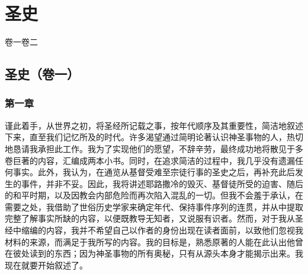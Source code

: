 
\chapter{圣史}


卷一\newline{}卷二\par



\section{圣史（卷一）}


\subsection{第一章}

谨此着手，从世界之初，将圣经所记载之事，按年代顺序及其重要性，简洁地叙述下来，直至我们记忆所及的时代。许多渴望通过简明论著认识神圣事物的人，热切地恳请我承担此工作。我为了实现他们的愿望，不辞辛劳，最终成功地将散见于多卷巨著的内容，汇编成两本小书。同时，在追求简洁的过程中，我几乎没有遗漏任何事实。此外，我认为，在通览从基督受难至宗徒行事的圣史之后，再补充此后发生的事件，并非不妥。因此，我将讲述耶路撒冷的毁灭、基督徒所受的迫害、随后的和平时期，以及因教会内部危险而再次陷入混乱的一切。但我不会羞于承认，在需要之处，我借助了世俗历史学家来确定年代、保持事件序列的连贯，并从中提取完整了解事实所缺的内容，以便既教导无知者，又说服有识者。然而，对于我从圣经中缩编的内容，我并不希望自己以作者的身份出现在读者面前，以致他们忽视我材料的来源，而满足于我所写的内容。我的目标是，熟悉原著的人能在此认出他曾在彼处读到的东西；因为神圣事物的所有奥秘，只有从源头本身才能揭示出来。我现在就要开始叙述了。\par

